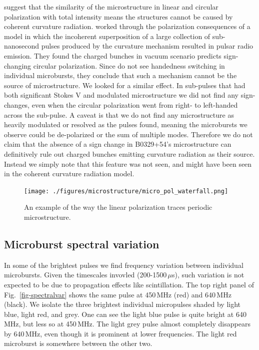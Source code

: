 \citet{2015ApJ...806..236M} suggest that the similarity of 
the microstructure in 
linear and circular polarization with total intensity 
means the structures cannot be 
caused by coherent curvature radiation. 
\citet{1990A&A...234..269G} worked through the 
polarization consequences of a model 
in which the incoherent superposition of a large 
collection of sub-nanosecond pulses produced 
by the curvature mechanism resulted in pulsar radio emission.
They found the charged bunches in vacuum scenario predicts
sign-changing circular polarization. Since 
\citet{2015ApJ...806..236M} do not see 
handedness switching in individual microbursts, they conclude 
that such a mechanism cannot be the source of microstructure.  
We looked for a similar effect. In sub-pulses that had both significant 
Stokes V and modulated microstructure we did not find any sign-changes, 
even when the circular polarization went from right- to left-handed
across the sub-pulse. A caveat is that we do not find any 
microstructure as heavily modulated or resolved as the pulses 
\citet{2015ApJ...806..236M} found, meaning the microbursts 
we observe could be de-polarized or the sum of multiple 
modes. Therefore we do not claim that the 
absence of a sign change in B0329+54's microstructure 
can definitively rule out charged bunches emitting 
curvature radiation as their source. Instead we simply note 
that this feature was not seen, and might have been seen 
in the coherent curvature radiation model.


\begin{figure}[!h]
\vspace{-0.1cm}
\begin{center}
\texttt{[image: ./figures/microstructure/micro\_pol\_waterfall.png]}
\caption{An example of the way the linear polarization 
     traces periodic microstructure.}
\label{fig-polwaterfall}
\end{center}
\end{figure}

\subsection{Microburst spectral variation}

In some of the brightest pulses we find frequency 
variation between individual microbursts. Given 
the timescales invovled (200-1500\,$\mu$s), such 
variation is not expected to be due to propagation 
effects like scintillation. The top right panel of 
Fig.~\ref{fig-spectralvar} shows the same pulse at 
450\,MHz (red) and 640\,MHz (black). We isolate the
three brightest individual micropulses shaded by 
light blue, light red, and grey. One can see the 
light blue pulse is quite bright at 640\,MHz, 
but less so at 450\,MHz. The light grey pulse almost 
completely disappears by 640\,MHz, even though 
it is prominent at lower frequencies. The light 
red microburst is somewhere between the other two.

